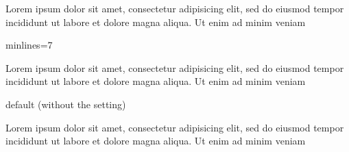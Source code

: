 \documentclass{article}
\begin{document}
{}

Lorem ipsum dolor sit amet, consectetur adipisicing elit, sed do eiusmod
tempor incididunt ut labore et dolore magna aliqua. Ut enim ad minim
veniam

\begin{clozepar}[minlines=7]
minlines=7
\end{clozepar}

Lorem ipsum dolor sit amet, consectetur adipisicing elit, sed do eiusmod
tempor incididunt ut labore et dolore magna aliqua. Ut enim ad minim
veniam

\begin{clozepar}
default (without the setting)
\end{clozepar}

Lorem ipsum dolor sit amet, consectetur adipisicing elit, sed do eiusmod
tempor incididunt ut labore et dolore magna aliqua. Ut enim ad minim
veniam
\end{document}
